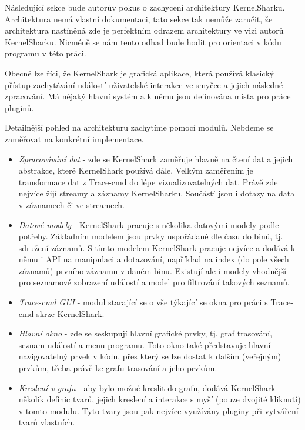 Následující sekce bude autorův pokus o zachycení architektury KernelSharku. Architektura nemá vlastní dokumentaci, tato sekce tak nemůže zaručit, že architektura nastíněná zde je perfektním odrazem architektury ve vizi autorů KernelSharku. Nicméně se nám tento odhad bude hodit pro orientaci v kódu programu v této práci.

Obecně lze říci, že KernelShark je grafická aplikace, která používá klasický přístup zachytávání událostí uživatelské interakce ve smyčce a jejich následné zpracování. Má nějaký hlavní systém a k němu jsou definována místa pro práce pluginů.

Detailnější pohled na architekturu zachytíme pomocí modulů. Nebdeme se zaměřovat na konkrétní implementace.
\begin{itemize}
    \item \emph{Zpracovávání dat} - zde se KernelShark zaměřuje hlavně na čtení dat a jejich abstrakce, které KernelShark používá dále. Velkým zaměřením je transformace dat z Trace-cmd do lépe vizualizovatelných dat. Právě zde nejvíce žijí streamy a záznamy KernelSharku. Součástí jsou i dotazy na data v záznamech či ve streamech.
    \item \emph{Datové modely} - KernelShark pracuje s několika datovými modely podle potřeby. Základním modelem jsou prvky uspořádané dle času do binů, tj. sdružení záznamů. S tímto modelem KernelShark pracuje nejvíce a dodává k němu i API na manipulaci a dotazování, například na index (do pole všech záznamů) prvního záznamu v daném binu. Existují ale i modely vhodnější pro seznamové zobrazení událostí a model pro filtrování takových seznamů.
    \item \emph{Trace-cmd GUI} - modul starající se o vše týkající se okna pro práci s Trace-cmd skrze KernelShark.
    \item \emph{Hlavní okno} - zde se seskupují hlavní grafické prvky, tj. graf trasování, seznam událostí a menu programu. Toto okno také představuje hlavní navigovatelný prvek v kódu, přes který se lze dostat k dalším (veřejným) prvkům, třeba právě ke grafu trasování a jeho prvkům.
    \item \emph{Kreslení v grafu} - aby bylo možné kreslit do grafu, dodává KernelShark několik definic tvarů, jejich kreslení a interakce s myší (pouze dvojité kliknutí) v tomto modulu. Tyto tvary jsou pak nejvíce využívány pluginy při vytváření tvarů vlastních.

\end{itemize}
